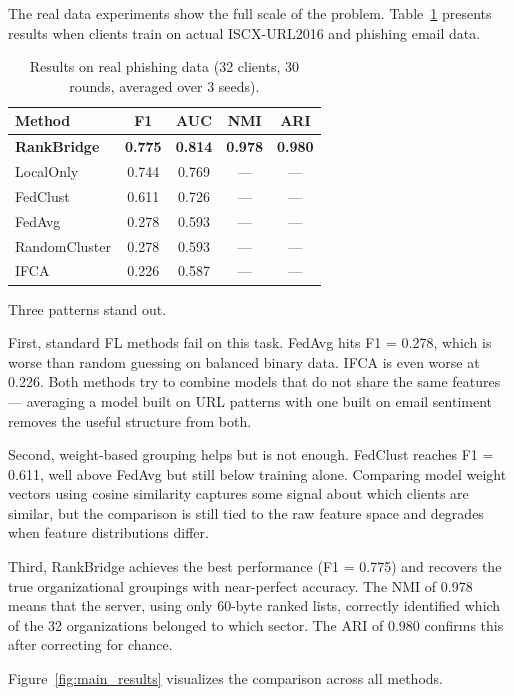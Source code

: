 \documentclass[12pt,a4paper]{article}
\begin{document}
The real data experiments show the full scale of the problem. Table~\ref{tab:real_results} presents results when clients train on actual ISCX-URL2016 and phishing email data.

\begin{table}[H]
\centering
\caption{Results on real phishing data (32 clients, 30 rounds, averaged over 3 seeds).}\label{tab:real_results}
\begin{tabular}{lcccc}
\toprule
\textbf{Method} & \textbf{F1} & \textbf{AUC} & \textbf{NMI} & \textbf{ARI} \\
\midrule
\textbf{RankBridge} & \textbf{0.775} & \textbf{0.814} & \textbf{0.978} & \textbf{0.980} \\
LocalOnly           & 0.744 & 0.769 & --- & --- \\
FedClust            & 0.611 & 0.726 & --- & --- \\
FedAvg              & 0.278 & 0.593 & --- & --- \\
RandomCluster       & 0.278 & 0.593 & --- & --- \\
IFCA                & 0.226 & 0.587 & --- & --- \\
\bottomrule
\end{tabular}
\end{table}

Three patterns stand out.

First, standard FL methods fail on this task. FedAvg hits F1 = 0.278, which is worse than random guessing on balanced binary data. IFCA is even worse at 0.226. Both methods try to combine models that do not share the same features --- averaging a model built on URL patterns with one built on email sentiment removes the useful structure from both.

Second, weight-based grouping helps but is not enough. FedClust reaches F1 = 0.611, well above FedAvg but still below training alone. Comparing model weight vectors using cosine similarity captures some signal about which clients are similar, but the comparison is still tied to the raw feature space and degrades when feature distributions differ.

Third, RankBridge achieves the best performance (F1 = 0.775) and recovers the true organizational groupings with near-perfect accuracy. The NMI of 0.978 means that the server, using only 60-byte ranked lists, correctly identified which of the 32 organizations belonged to which sector. The ARI of 0.980 confirms this after correcting for chance.

Figure~\ref{fig:main_results} visualizes the comparison across all methods.
\end{document}
